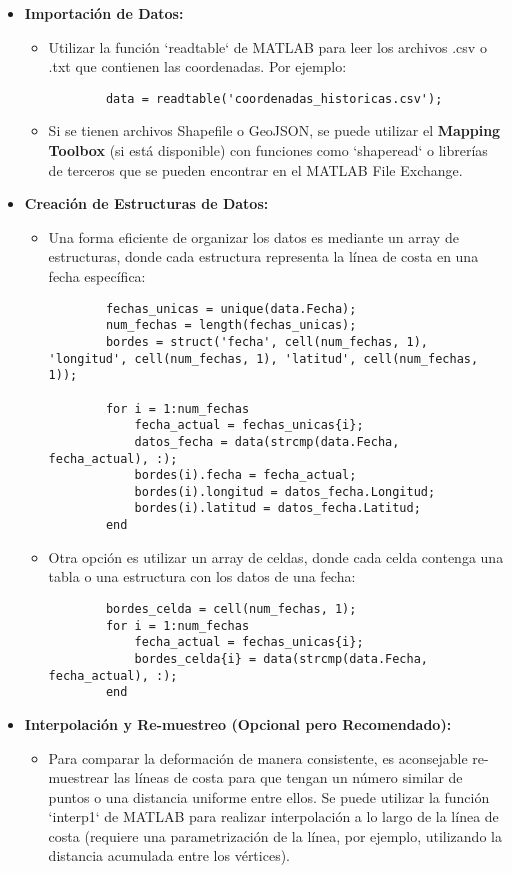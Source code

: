 \documentclass{article}
\begin{document}
\begin{itemize}
    \item \textbf{Importación de Datos:}
    \begin{itemize}
        \item Utilizar la función `readtable` de MATLAB para leer los archivos .csv o .txt que contienen las coordenadas. Por ejemplo:
        \begin{verbatim}
        data = readtable('coordenadas_historicas.csv');
        \end{verbatim}
        \item Si se tienen archivos Shapefile o GeoJSON, se puede utilizar el \textbf{Mapping Toolbox} (si está disponible) con funciones como `shaperead` o librerías de terceros que se pueden encontrar en el MATLAB File Exchange.
    \end{itemize}
    \item \textbf{Creación de Estructuras de Datos:}
    \begin{itemize}
        \item Una forma eficiente de organizar los datos es mediante un array de estructuras, donde cada estructura representa la línea de costa en una fecha específica:
        \begin{verbatim}
        fechas_unicas = unique(data.Fecha);
        num_fechas = length(fechas_unicas);
        bordes = struct('fecha', cell(num_fechas, 1), 'longitud', cell(num_fechas, 1), 'latitud', cell(num_fechas, 1));

        for i = 1:num_fechas
            fecha_actual = fechas_unicas{i};
            datos_fecha = data(strcmp(data.Fecha, fecha_actual), :);
            bordes(i).fecha = fecha_actual;
            bordes(i).longitud = datos_fecha.Longitud;
            bordes(i).latitud = datos_fecha.Latitud;
        end
        \end{verbatim}
        \item Otra opción es utilizar un array de celdas, donde cada celda contenga una tabla o una estructura con los datos de una fecha:
        \begin{verbatim}
        bordes_celda = cell(num_fechas, 1);
        for i = 1:num_fechas
            fecha_actual = fechas_unicas{i};
            bordes_celda{i} = data(strcmp(data.Fecha, fecha_actual), :);
        end
        \end{verbatim}
    \end{itemize}
    \item \textbf{Interpolación y Re-muestreo (Opcional pero Recomendado):}
    \begin{itemize}
        \item Para comparar la deformación de manera consistente, es aconsejable re-muestrear las líneas de costa para que tengan un número similar de puntos o una distancia uniforme entre ellos. Se puede utilizar la función `interp1` de MATLAB para realizar interpolación a lo largo de la línea de costa (requiere una parametrización de la línea, por ejemplo, utilizando la distancia acumulada entre los vértices).
    \end{itemize}
\end{itemize}
\end{document}
